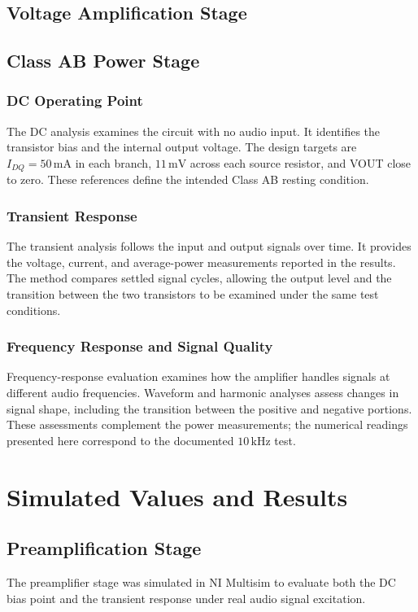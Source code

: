 \documentclass[conference,letterpaper]{IEEEtran}
\newcommand{\kHz}{\mathrm{kHz}}
\begin{document}
\subsection{Voltage Amplification Stage}

\subsection{Class AB Power Stage}
\subsubsection{DC Operating Point}

The DC analysis examines the circuit with no audio input. It identifies
the transistor bias and the internal output voltage. The design targets
are $I_{DQ}=50\,\mathrm{mA}$ in each branch, $11\,\mathrm{mV}$ across
each source resistor, and VOUT close to zero. These
references define the intended Class AB resting condition.

\subsubsection{Transient Response}

The transient analysis follows the input and output signals over time.
It provides the voltage, current, and average-power measurements
reported in the results. The method compares settled signal cycles,
allowing the output level and the transition between the two
transistors to be examined under the same test conditions.

\subsubsection{Frequency Response and Signal Quality}

Frequency-response evaluation examines how the amplifier handles
signals at different audio frequencies. Waveform and harmonic analyses
assess changes in signal shape, including the transition between the
positive and negative portions. These assessments complement the
power measurements; the numerical readings presented here correspond
to the documented $10\,\kHz$ test.

\FloatBarrier
\section{Simulated Values and Results}
\subsection{Preamplification Stage}
The preamplifier stage was simulated in NI Multisim to evaluate both the DC bias point and the transient response under real audio signal excitation. 
\end{document}
